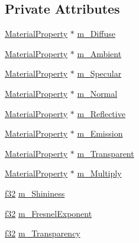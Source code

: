 \subsection*{Private Attributes}
\begin{DoxyCompactItemize}
\item 
\mbox{\hyperlink{classnjli_1_1_material_property}{Material\+Property}} $\ast$ \mbox{\hyperlink{classnjli_1_1_material_a9b605c885d158f6bcf3510c7bc0c8c0e}{m\+\_\+\+Diffuse}}
\item 
\mbox{\hyperlink{classnjli_1_1_material_property}{Material\+Property}} $\ast$ \mbox{\hyperlink{classnjli_1_1_material_ab6e95c0a9083cc7836aa027e16c843f5}{m\+\_\+\+Ambient}}
\item 
\mbox{\hyperlink{classnjli_1_1_material_property}{Material\+Property}} $\ast$ \mbox{\hyperlink{classnjli_1_1_material_ac40bacaa57dc01a8ef74c1a346675056}{m\+\_\+\+Specular}}
\item 
\mbox{\hyperlink{classnjli_1_1_material_property}{Material\+Property}} $\ast$ \mbox{\hyperlink{classnjli_1_1_material_ae209e334a114b1a29643d4f1c3fdfada}{m\+\_\+\+Normal}}
\item 
\mbox{\hyperlink{classnjli_1_1_material_property}{Material\+Property}} $\ast$ \mbox{\hyperlink{classnjli_1_1_material_ad73e3e455a6801b7dfee1c17f4ee2664}{m\+\_\+\+Reflective}}
\item 
\mbox{\hyperlink{classnjli_1_1_material_property}{Material\+Property}} $\ast$ \mbox{\hyperlink{classnjli_1_1_material_abf9bf481eac85f01fbed79bb520c634f}{m\+\_\+\+Emission}}
\item 
\mbox{\hyperlink{classnjli_1_1_material_property}{Material\+Property}} $\ast$ \mbox{\hyperlink{classnjli_1_1_material_ac622968e9f93c0434701ede20d11750e}{m\+\_\+\+Transparent}}
\item 
\mbox{\hyperlink{classnjli_1_1_material_property}{Material\+Property}} $\ast$ \mbox{\hyperlink{classnjli_1_1_material_affbb378b516bf6c39df30e390f1deb84}{m\+\_\+\+Multiply}}
\item 
\mbox{\hyperlink{_util_8h_a5f6906312a689f27d70e9d086649d3fd}{f32}} \mbox{\hyperlink{classnjli_1_1_material_a130ba87d3c1d84af92b533f8a5048385}{m\+\_\+\+Shininess}}
\item 
\mbox{\hyperlink{_util_8h_a5f6906312a689f27d70e9d086649d3fd}{f32}} \mbox{\hyperlink{classnjli_1_1_material_a5635224a80fd28c8da170225ea69102f}{m\+\_\+\+Fresnel\+Exponent}}
\item 
\mbox{\hyperlink{_util_8h_a5f6906312a689f27d70e9d086649d3fd}{f32}} \mbox{\hyperlink{classnjli_1_1_material_ab1312ba0234332d75f4727851c9f5974}{m\+\_\+\+Transparency}}

\end{DoxyCompactItemize}
